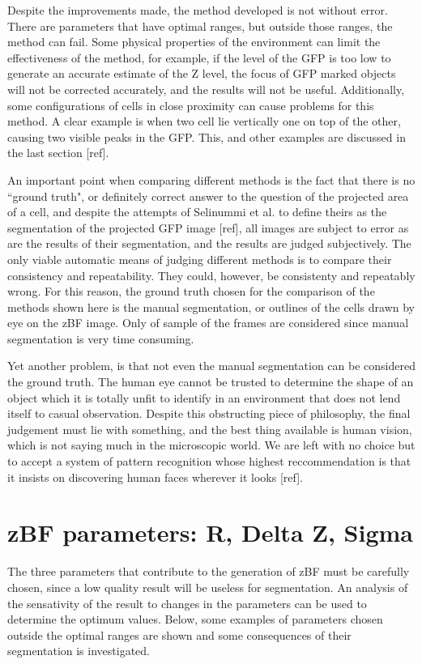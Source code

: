 Despite the improvements made, the method developed is not without error. There are parameters that have optimal ranges, but outside those ranges, the method can fail. Some physical properties of the environment can limit the effectiveness of the method, for example, if the level of the GFP is too low to generate an accurate estimate of the Z level, the focus of GFP marked objects will not be corrected accurately, and the results will not be useful. Additionally, some configurations of cells in close proximity can cause problems for this method. A clear example is when two cell lie vertically one on top of the other, causing two visible peaks in the GFP. This, and other examples are discussed in the last section [ref].

An important point when comparing different methods is the fact that there is no ``ground truth", or definitely correct answer to the question of the projected area of a cell, and despite the attempts of Selinummi et al. to define theirs as the segmentation of the projected GFP image [ref], all images are subject to error as are the results of their segmentation, and the results are judged subjectively. The only viable automatic means of judging different methods is to compare their consistency and repeatability. They could, however, be consistenty and repeatably wrong. For this reason, the ground truth chosen for the comparison of the methods shown here is the manual segmentation, or outlines of the cells drawn by eye on the zBF image. Only of sample of the frames are considered since manual segmentation is very time consuming.

Yet another problem, is that not even the manual segmentation can be considered the ground truth. The human eye cannot be trusted to determine the shape of an object which it is totally unfit to identify in an environment that does not lend itself to casual observation. Despite this obstructing piece of philosophy, the final judgement must lie with something, and the best thing available is human vision, which is not saying much in the microscopic world. We are left with no choice but to accept a system of pattern recognition whose highest reccommendation is that it insists on discovering human faces wherever it looks [ref].

\section{zBF parameters: R, Delta Z, Sigma}

The three parameters that contribute to the generation of zBF must be carefully chosen, since a low quality result will be useless for segmentation. An analysis of the sensativity of the result to changes in the parameters can be used to determine the optimum values. Below, some examples of parameters chosen outside the optimal ranges are shown and some consequences of their segmentation is investigated.

